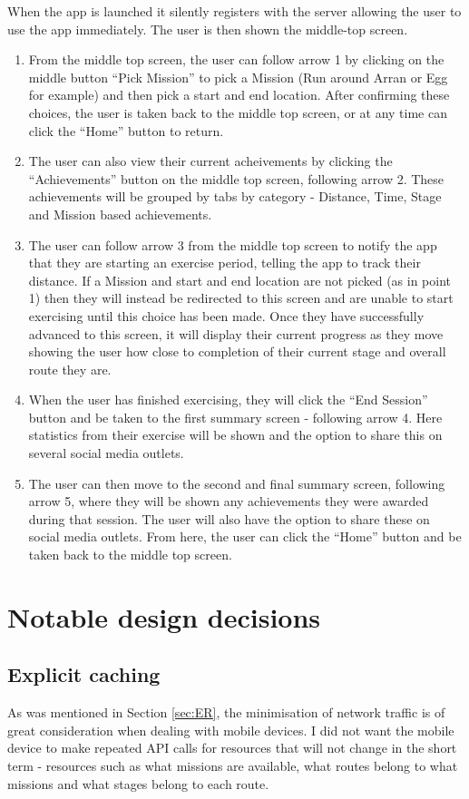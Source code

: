When the app is launched it silently registers with the server
allowing the user to use the app immediately. The user is then shown
the middle-top screen.
\begin{enumerate}
\item From the middle top screen, the user can follow arrow 1 by
  clicking on the middle button ``Pick Mission'' to pick a Mission
  (Run around Arran or Egg for example) and then pick a start and
  end location. After confirming these choices, the user is taken
  back to the middle top screen, or at any time can click the
  ``Home'' button to return. 
\item The user can also view their current acheivements by clicking
  the ``Achievements'' button on the middle top screen, following
  arrow 2. These achievements will be grouped by tabs by category -
  Distance, Time, Stage and Mission based achievements.
\item The user can follow arrow 3 from the middle top screen to
  notify the app that they are starting an exercise period, telling
  the app to track their distance. If a Mission and start and end
  location are not picked (as in point 1) then they will instead be
  redirected to this screen and are unable to start exercising until
  this choice has been made. Once they have successfully advanced to
  this screen, it will display their current progress as they move
  showing the user how close to completion of their current stage
  and overall route they are. 
\item When the user has finished exercising, they will click the
  ``End Session'' button and be taken to the first summary screen -
  following arrow 4. Here statistics from their exercise will be
  shown and the option to share this on several social media
  outlets.
\item The user can then move to the second and final summary screen,
  following arrow 5, where they will be shown any achievements they
  were awarded during that session. The user will also have the
  option to share these on social media outlets. From here, the user
  can click the ``Home'' button and be taken back to the middle top
  screen. 
\end{enumerate}

\section{Notable design decisions}
\subsection{Explicit caching}
As was mentioned in Section \ref{sec:ER}, the minimisation of network
traffic is of great consideration when dealing with mobile devices. I
did not want the mobile device to make repeated API calls for
resources that will not change in the short term - resources such as
what missions are available, what routes belong to what missions and
what stages belong to each route. 

